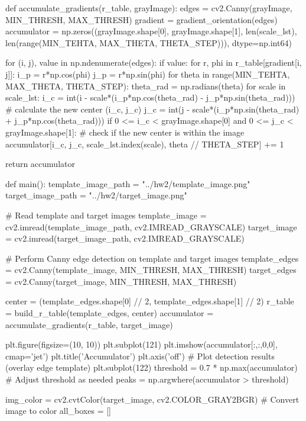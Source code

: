 \documentclass[10pt]{article}
\begin{document}
\begin{python}

def accumulate_gradients(r_table, grayImage):
    edges = cv2.Canny(grayImage, MIN_THRESH, MAX_THRESH)
    gradient = gradient_orientation(edges)
    accumulator = np.zeros((grayImage.shape[0], grayImage.shape[1], len(scale_lst), len(range(MIN_TEHTA, MAX_THETA, THETA_STEP))), dtype=np.int64)

    for (i, j), value in np.ndenumerate(edges):
        if value:
            for r, phi in r_table[gradient[i, j]]:
                i_p = r*np.cos(phi)
                j_p = r*np.sin(phi)
                for theta in range(MIN_TEHTA, MAX_THETA, THETA_STEP):
                    theta_rad = np.radians(theta)
                    for scale in scale_lst:
                        i_c = int(i - scale*(i_p*np.cos(theta_rad) - j_p*np.sin(theta_rad)))  # calculate the new center (i_c, j_c)
                        j_c = int(j - scale*(i_p*np.sin(theta_rad) + j_p*np.cos(theta_rad)))
                        if 0 <= i_c < grayImage.shape[0] and 0 <= j_c < grayImage.shape[1]:  # check if the new center is within the image
                            accumulator[i_c, j_c, scale_lst.index(scale), theta // THETA_STEP] += 1

    return accumulator

def main():
    template_image_path = "../hw2/template_image.png"
    target_image_path = "../hw2/target_image.png"

    # Read template and target images
    template_image = cv2.imread(template_image_path, cv2.IMREAD_GRAYSCALE)
    target_image = cv2.imread(target_image_path, cv2.IMREAD_GRAYSCALE)

    # Perform Canny edge detection on template and target images
    template_edges = cv2.Canny(template_image,  MIN_THRESH, MAX_THRESH)
    target_edges = cv2.Canny(target_image,  MIN_THRESH, MAX_THRESH)

    center = (template_edges.shape[0] // 2, template_edges.shape[1] // 2)
    r_table = build_r_table(template_edges, center)
    accumulator = accumulate_gradients(r_table, target_image)

    plt.figure(figsize=(10, 10))
    plt.subplot(121)
    plt.imshow(accumulator[:,:,0,0], cmap='jet')
    plt.title('Accumulator')
    plt.axis('off')
    # Plot detection results (overlay edge template)
    plt.subplot(122)
    threshold = 0.7 * np.max(accumulator)  # Adjust threshold as needed
    peaks = np.argwhere(accumulator > threshold)

    img_color = cv2.cvtColor(target_image, cv2.COLOR_GRAY2BGR)  # Convert image to color
    all_boxes = []


\end{python}
\end{document}
